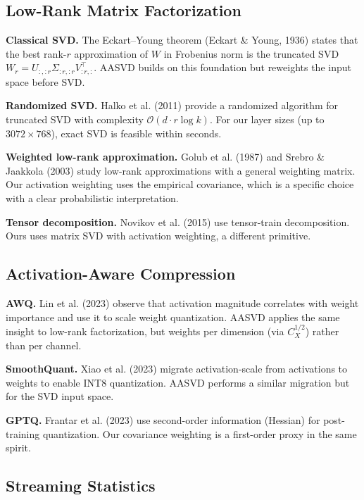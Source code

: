 \subsection{Low-Rank Matrix Factorization}

\textbf{Classical SVD.} The Eckart--Young theorem (Eckart \& Young, 1936) states 
that the best rank-$r$ approximation of $W$ in Frobenius norm is the 
truncated SVD $W_r = U_{:, :r} \Sigma_{:r, :r} V_{:r, :}^\top$. AASVD builds 
on this foundation but reweights the input space before SVD.

\textbf{Randomized SVD.} Halko et al. (2011) provide a randomized algorithm for 
truncated SVD with complexity $\mathcal{O}(d \cdot r \log k)$. For our layer 
sizes (up to $3072 \times 768$), exact SVD is feasible within seconds.

\textbf{Weighted low-rank approximation.} Golub et al. (1987) and Srebro \& Jaakkola 
(2003) study low-rank approximations with a general weighting matrix. Our 
activation weighting uses the empirical covariance, which is a specific 
choice with a clear probabilistic interpretation.

\textbf{Tensor decomposition.} Novikov et al. (2015) use tensor-train decomposition. 
Ours uses matrix SVD with activation weighting, a different primitive.

\subsection{Activation-Aware Compression}

\textbf{AWQ.} Lin et al. (2023) observe that activation magnitude correlates 
with weight importance and use it to scale weight quantization. AASVD 
applies the same insight to low-rank factorization, but weights per dimension 
(via $C_X^{1/2}$) rather than per channel.

\textbf{SmoothQuant.} Xiao et al. (2023) migrate activation-scale from activations 
to weights to enable INT8 quantization. AASVD performs a similar migration 
but for the SVD input space.

\textbf{GPTQ.} Frantar et al. (2023) use second-order information (Hessian) for 
post-training quantization. Our covariance weighting is a first-order proxy 
in the same spirit.

\subsection{Streaming Statistics}

